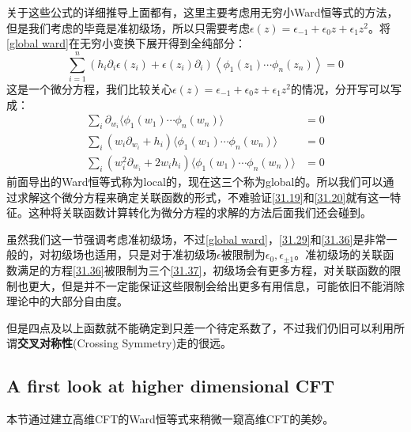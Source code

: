 关于这些公式的详细推导\cite{ito}上面都有，这里主要考虑用无穷小Ward恒等式的方法，但是我们考虑的毕竟是准初级场，所以只需要考虑$\epsilon(z)=\epsilon_{-1}+\epsilon_0z+\epsilon_1z^2$。将\ref{global ward}在无穷小变换下展开得到全纯部分：
\begin{equation}\label{31.36}
	\boxed{
		\displaystyle\sum_{i=1}^{n}\left(h_{i}\partial_{i}\epsilon\left(z_{i}\right)+\epsilon\left(z_{i}\right)\partial_{i}\right)\left<\phi_{1}\left(z_{1}\right)\cdots\phi_{n}\left(z_{n}\right)\right>=0
	}
\end{equation}
这是一个微分方程，我们比较关心$\epsilon(z)=\epsilon_{-1}+\epsilon_0z+\epsilon_1z^2$的情况，分开写可以写成：
\begin{equation}\label{31.37}
	\begin{aligned}\sum_i\partial_{w_i}\langle\phi_1(w_1)\cdots\phi_n(w_n)\rangle&=0\\\sum_i(w_i\partial_{w_i}+h_i)\langle\phi_1(w_1)\cdots\phi_n(w_n)\rangle&=0\\\sum_i(w_i^2\partial_{w_i}+2w_ih_i)\langle\phi_1(w_1)\cdots\phi_n(w_n)\rangle&=0\end{aligned}
\end{equation}
前面导出的Ward恒等式称为local的，现在这三个称为global的。所以我们可以通过求解这个微分方程来确定关联函数的形式，不难验证\ref{31.19}和\ref{31.20}就有这一特征。这种将关联函数计算转化为微分方程的求解的方法后面我们还会碰到。
\begin{remark}
	虽然我们这一节强调考虑准初级场，不过\ref{global ward}，\ref{31.29}和\ref{31.36}是非常一般的，对初级场也适用，只是对于准初级场$\epsilon$被限制为$\epsilon_0,\epsilon_{\pm1}$。准初级场的关联函数满足的方程\ref{31.36}被限制为三个\ref{31.37}，初级场会有更多方程，对关联函数的限制也更大，但是并不一定能保证这些限制会给出更多有用信息，可能依旧不能消除理论中的大部分自由度。
\end{remark}
但是四点及以上函数就不能确定到只差一个待定系数了，不过我们仍旧可以利用所谓\textbf{交叉对称性}(Crossing Symmetry)走的很远。
\subsection{A first look at higher dimensional CFT}
本节通过建立高维CFT的Ward恒等式来稍微一窥高维CFT的美妙。
